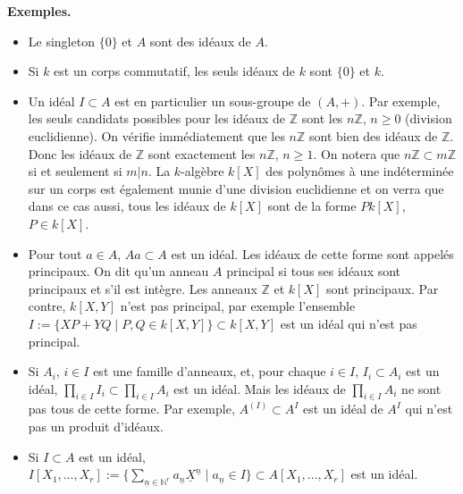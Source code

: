 \documentclass[a4paper, oneside, 12pt]{book}
\theoremstyle{definition} %
\newcommand{\Z}{\mathbb{Z}}
\newcommand{\N}{\mathbb{N}}
\begin{document}
\textbf{Exemples.}
\begin{itemize}[leftmargin=* ,parsep=0cm,itemsep=0cm,topsep=0cm]
\item Le singleton  $\lbrace 0\rbrace$ et $A$ sont  des idéaux de $A$.
\item Si $k$ est un corps commutatif, les seuls idéaux de $k$ sont  $\lbrace 0\rbrace$ et $k$.
\item Un idéal $I\subset A$ est en particulier un sous-groupe de $(A,+)$. Par exemple, les seuls candidats possibles pour les idéaux de $\Z$ sont les $n\Z$, $n\geq 0$ (division euclidienne). On vérifie immédiatement que les $n\Z$ sont bien des idéaux de $\Z$. Donc les idéaux de $\Z$ sont exactement les $n\Z$, $n\geq 1$. On notera que $n\Z\subset m\Z$ si et seulement si $m|n$.  La $k$-algèbre $k[X]$ des polynômes à une indéterminée sur un corps est également munie d'une division euclidienne et on verra que dans ce cas aussi, tous les idéaux de $k[X]$ sont de la forme $Pk[X]$, $P\in k[X]$.
\item Pour tout $a\in A$, $Aa\subset A$ est un idéal. Les idéaux de cette forme sont appelés principaux. On dit qu'un anneau $A$ principal si tous ses idéaux sont principaux et s'il est intègre. Les anneaux $\Z$ et $k[X]$ sont principaux.  Par contre, $k[X,Y]$ n'est pas principal, par exemple l'ensemble $I:=\lbrace XP+YQ\;|\; P,Q\in k[X,Y]\rbrace\subset k[X,Y]$ est un idéal qui n'est pas principal.
\item Si $A_i$, $i\in I$ est une famille d'anneaux, et, pour chaque $i\in I$, $I_i\subset A_i$ est un idéal, $\prod_{i\in I}I_i\subset \prod_{i\in I}A_i$ est un idéal. Mais les idéaux de $\prod_{i\in I}A_i$ ne sont pas tous de cette forme. Par exemple, $A^{(I)}\subset A^I$ est un idéal de $A^I$ qui n'est pas un produit d'idéaux.
\item Si $I\subset A$ est un idéal, $I[X_1,\dots, X_r]:=\lbrace\sum_{\underline{n}\in \N^r}a_{\underline{n}}\underline{X}^{\underline{n}}\;|\; a_{\underline{n}}\in I \rbrace \subset A[X_1,\dots,X_r]$ est un idéal.

\end{itemize}
 
\end{document}
